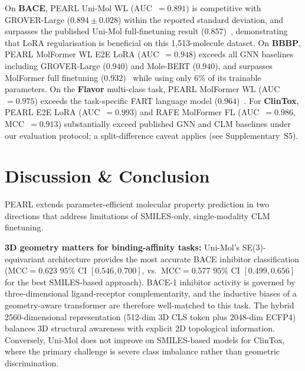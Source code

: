 \documentclass[9pt,twocolumn,conference]{IEEEtran}
\begin{document}
On \textbf{BACE}, PEARL Uni-Mol WL (AUC~$= 0.891$) is competitive with GROVER-Large
($0.894 \pm 0.028$) within the reported standard deviation, and surpasses the published
Uni-Mol full-finetuning result ($0.857$)~\cite{zhou2023unimol}, demonstrating that LoRA
regularisation is beneficial on this 1{,}513-molecule dataset.
On \textbf{BBBP}, PEARL MolFormer WL E2E LoRA (AUC~$= 0.948$) exceeds all GNN baselines
including GROVER-Large ($0.940$) and Mole-BERT ($0.940$), and surpasses MolFormer full
finetuning ($0.932$)~\cite{ross2022molformer} while using only $6\%$ of its trainable
parameters.
On the \textbf{Flavor} multi-class task, PEARL MolFormer WL (AUC~$= 0.975$) exceeds the
task-specific FART language model ($0.964$)~\cite{zimmermann2024fart}.
For \textbf{ClinTox}, PEARL E2E LoRA (AUC~$= 0.993$) and RAFE MolFormer FL
(AUC~$= 0.986$, MCC~$= 0.913$) substantially exceed published GNN and CLM baselines
under our evaluation protocol; a split-difference caveat applies (see Supplementary~S5).

\section{Discussion \& Conclusion}
PEARL extends parameter-efficient molecular property prediction in two directions that address limitations of SMILES-only, single-modality CLM finetuning. 

\textbf{3D geometry matters for binding-affinity tasks:}
Uni-Mol's SE(3)-equivariant architecture provides the most accurate BACE inhibitor classification (MCC$=$0.623 $95\%$ CI $[0.546, 0.700]$, vs.\ MCC$=$0.577 $95\%$ CI $[0.499, 0.656]$ for the best SMILES-based approach). BACE-1 inhibitor activity is governed by three-dimensional ligand-receptor complementarity, and the inductive biases of a geometry-aware transformer are therefore well-matched to this task. The hybrid 2560-dimensional representation (512-dim 3D CLS token plus 2048-dim ECFP4) balances 3D structural awareness with explicit 2D topological information. Conversely, Uni-Mol does not improve on SMILES-based models for ClinTox, where the primary challenge is severe class imbalance rather than geometric discrimination.
\end{document}

